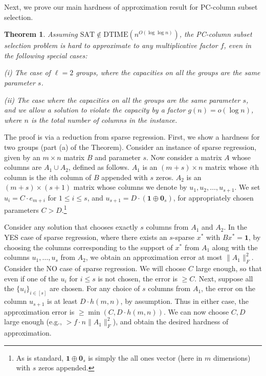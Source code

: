 \documentclass[11pt]{article}
\makeatletter
\theoremstyle{plain}
\newtheorem{theorem}{Theorem}[section]
\theoremstyle{plain}
\theoremstyle{definition}
\theoremstyle{plain}
\theoremstyle{remark}
\newenvironment{proof}[1][\protect\proofname]{\par
	\normalfont\topsep6\p@\@plus6\p@\relax
	\trivlist
	\itemindent\parindent
	\item[\hskip\labelsep\scshape #1]\ignorespaces
}{\endtrivlist\@endpefalse
}
\providecommand{\proofname}{Proof}
\DeclareRobustCommand{\fairCSSx}{PC-column subset selection}
\makeatother
\begin{document}
Next, we prove our main hardness of approximation result for \fairCSSx{}.

\begin{theorem}\label{thm:hard-CSS}
Assuming $\mathrm{SAT} \notin \mathrm{DTIME}(n^{O(\log \log n)})$, the \fairCSSx{} problem is hard to approximate to any multiplicative factor $f$, even in the following special cases:

(i) The case of $\ell=2$ groups, where the capacities on all the groups are the same parameter $s$.

(ii) The case where the capacities on all the groups are the same parameter $s$, and we allow a solution to violate the capacity by a factor $g(n) = o(\log n)$, where $n$ is the total number of columns in the instance.
\end{theorem}
\begin{proof}
The proof is via a reduction from sparse regression. First, we show a hardness for two groups (part (a) of the Theorem). Consider an instance of sparse regression, given by an $m\times n$ matrix $B$ and parameter $s$. Now consider a matrix $A$ whose columns are $A_1 \cup A_2$, defined as follows. $A_1$ is an $(m+s)\times n$ matrix whose $i$th column is the $i$th column of $B$ appended with $s$ zeros. $A_2$ is an $(m+s) \times (s+1)$ matrix whose columns we denote by $u_1, u_2, \dots, u_{s+1}$. We set $u_i = C \cdot e_{m+i}$ for $1 \le i \le s$, and $u_{s+1} = D \cdot (\mathbf{1} \oplus \mathbf{0}_s)$, for appropriately chosen parameters $C > D$.\footnote{As is standard, $\mathbf{1} \oplus \mathbf{0}_s$ is simply the all ones vector (here in $m$ dimensions) with $s$ zeros appended.}

Consider any solution that chooses exactly $s$ columns from $A_1$ and $A_2$. In the YES case of sparse regression, where there exists an $s$-sparse $x^*$ with $Bx^* = \mathbf{1}$, by choosing the columns corresponding to the support of  $x^*$ from $A_1$ along with the columns $u_1, \dots, u_s$ from $A_2$, we obtain an approximation error at most $\| A_1 \|_F^2$. Consider the NO case of sparse regression. We will choose $C$ large enough, so that even if one of the $u_i$ for $i\le s$ is not chosen, the error is $\ge C$. Next, suppose all the $\{u_i\}_{i \in [s]}$ are chosen. For any choice of $s$ columns from $A_1$, the error on the column $u_{s+1}$ is at least $D \cdot h(m,n)$, by assumption. Thus in either case, the approximation error is $\ge \min \left( C, D \cdot h(m,n) \right)$. We can now choose $C, D$ large enough (e.g., $> f \cdot n \| A_1 \|_F^2$), and obtain the desired hardness of approximation.


\end{proof}
\end{document}
